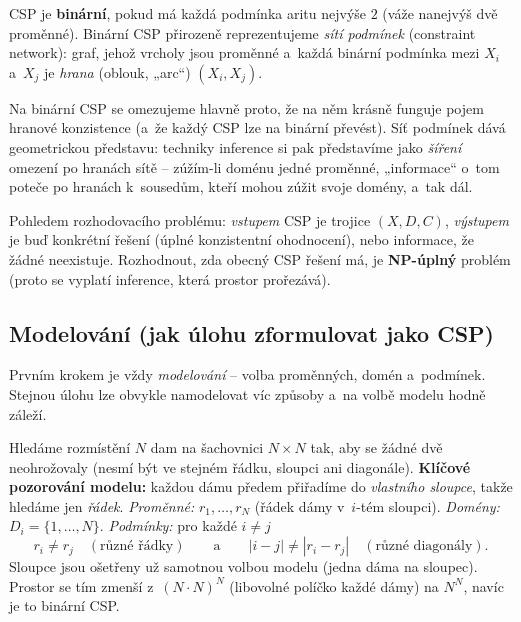 \begin{definice}
CSP je \textbf{binární}, pokud má každá podmínka aritu nejvýše $2$ (váže nanejvýš dvě proměnné). Binární CSP přirozeně reprezentujeme \emph{sítí podmínek} (constraint network): graf, jehož vrcholy jsou proměnné a~každá binární podmínka mezi $X_i$ a~$X_j$ je \emph{hrana} (oblouk, „arc``) $(X_i,X_j)$.
\end{definice}

\begin{intuice}
Na binární CSP se omezujeme hlavně proto, že na něm krásně funguje pojem hranové konzistence (a~že každý CSP lze na binární převést). Síť podmínek dává geometrickou představu: techniky inference si pak představíme jako \emph{šíření} omezení po hranách sítě -- zúžím-li doménu jedné proměnné, „informace`` o~tom poteče po hranách k~sousedům, kteří mohou zúžit svoje domény, a~tak dál.
\end{intuice}

\begin{poznamka}
Pohledem rozhodovacího problému: \emph{vstupem} CSP je trojice $(X,D,C)$, \emph{výstupem} je buď konkrétní řešení (úplné konzistentní ohodnocení), nebo informace, že žádné neexistuje. Rozhodnout, zda obecný CSP řešení má, je \textbf{NP-úplný} problém (proto se vyplatí inference, která prostor prořezává).
\end{poznamka}

\subsection{Modelování (jak úlohu zformulovat jako CSP)}

Prvním krokem je vždy \emph{modelování} -- volba proměnných, domén a~podmínek. Stejnou úlohu lze obvykle namodelovat víc způsoby a~na volbě modelu hodně záleží.

\begin{priklad}
Hledáme rozmístění $N$ dam na šachovnici $N\times N$ tak, aby se žádné dvě neohrožovaly (nesmí být ve stejném řádku, sloupci ani diagonále). \textbf{Klíčové pozorování modelu:} každou dámu předem přiřadíme do \emph{vlastního sloupce}, takže hledáme jen \emph{řádek}. \emph{Proměnné:} $r_1,\dots,r_N$ (řádek dámy v~$i$-tém sloupci). \emph{Domény:} $D_i=\{1,\dots,N\}$. \emph{Podmínky:} pro každé $i\neq j$
\[ r_i \neq r_j \quad(\text{různé řádky}) \qquad\text{a}\qquad |i-j| \neq |r_i - r_j| \quad(\text{různé diagonály}). \]
Sloupce jsou ošetřeny už samotnou volbou modelu (jedna dáma na sloupec). Prostor se tím zmenší z~$(N\!\cdot\!N)^N$ (libovolné políčko každé dámy) na $N^N$, navíc je to binární CSP.
\end{priklad}

